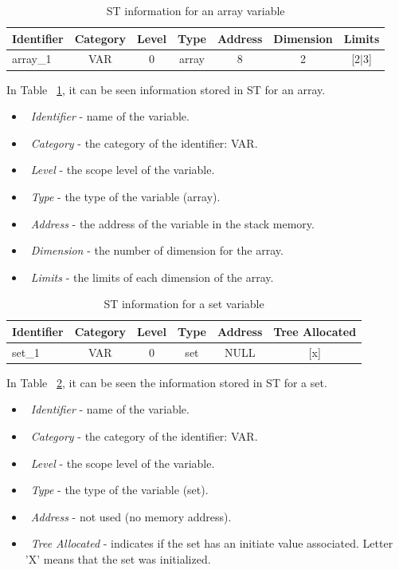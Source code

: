 \documentclass[
  oneside,
  11pt, a4paper,
  footinclude=true,
  headinclude=true,
  cleardoublepage=empty
]{scrbook}
\begin{document}
\begin{table}[h!]
\centering
\caption{ST information for an array variable}
\label{tbl:var_array_information}
\begin{tabular}{l|c|c|c|c|l|l}
\multicolumn{1}{c|}{Identifier} & Category & Level & Type    & Address & Dimension              & Limits                        \\ \hline
array\_1                        & VAR      & 0     & array & 8       & \multicolumn{1}{c|}{2} & \multicolumn{1}{c}{{[}2$|$3{]}}
\end{tabular}
\end{table}

In Table ~\ref{tbl:var_array_information}, it can be seen information stored in ST for an array.
\begin{itemize}
\item ~\textit{Identifier} - name of the variable.
\item ~\textit{Category} - the category of the identifier: VAR.
\item ~\textit{Level} - the scope level of the variable.
\item ~\textit{Type} - the type of the variable (array).
\item ~\textit{Address} - the address of the variable in the stack memory.
\item ~\textit{Dimension} - the number of dimension for the array.
\item ~\textit{Limits} - the limits of each dimension of the array.
\end{itemize}

\begin{table}[h!]
\centering
\caption{ST information for a set variable}
\label{tbl:var_set_information}
\begin{tabular}{l|c|c|c|c|l}
\multicolumn{1}{c|}{Identifier} & Category & Level & Type    & Address & Tree Allocated              \\ \hline
set\_1                          & VAR      & 0     & set & NULL     & \multicolumn{1}{c}{{[}x{]}}
\end{tabular}
\end{table}

In Table ~\ref{tbl:var_set_information}, it can be seen the information stored in ST for a set.
\begin{itemize}
\item ~\textit{Identifier} - name of the variable.
\item ~\textit{Category} - the category of the identifier: VAR.
\item ~\textit{Level} - the scope level of the variable.
\item ~\textit{Type} - the type of the variable (set).
\item ~\textit{Address} - not used (no memory address).
\item ~\textit{Tree Allocated} - indicates if the set has an initiate value associated. Letter 'X' means that the set was initialized.
\end{itemize}
\end{document}
